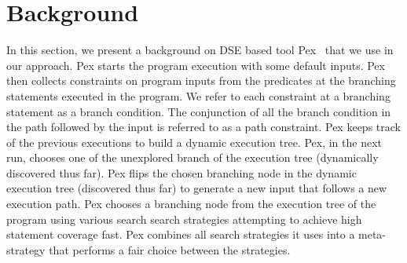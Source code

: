 \section{Background}
In this section, we present a background on DSE based tool Pex~\cite{Pex} that we use in our approach. Pex starts the program execution with some default inputs. Pex then collects constraints on program inputs from the predicates at the branching statements executed in the program. We refer to each constraint at a branching statement as a branch condition. 
The conjunction of all the branch condition in the path followed by the input is referred to as a path constraint. Pex keeps track of the previous executions to build a dynamic execution tree. Pex, in the next run, chooses one of the unexplored branch of the execution tree (dynamically discovered thus far). Pex flips the chosen branching node in the dynamic execution tree (discovered thus far) to generate a new input that follows a new execution path. Pex chooses a branching node from the execution tree of the program using various search search strategies attempting to achieve high statement coverage fast. Pex combines all search strategies it uses into a meta-strategy that performs a fair choice between the strategies.
 
